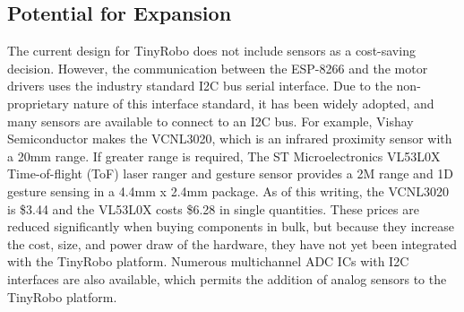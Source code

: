 \documentclass[]{article}
\begin{document}
\subsection{Potential for Expansion}

The current design for TinyRobo does not include sensors as a cost-saving decision. 
However, the communication between the ESP-8266 and the motor drivers uses the industry standard I2C bus serial interface. 
Due to the non-proprietary nature of this interface standard, it has been widely adopted, and many sensors are available to connect to an I2C bus. 
For example, Vishay Semiconductor makes the VCNL3020, which is an infrared proximity sensor with a 20mm range. 
If greater range is required, The ST Microelectronics VL53L0X Time-of-flight (ToF) laser ranger and gesture sensor provides a 2M range and 1D gesture sensing in a 4.4mm x 2.4mm package. 
As of this writing, the VCNL3020 is \$3.44 and the VL53L0X costs \$6.28 in single quantities.
These prices are reduced significantly when buying components in bulk, but because they increase the cost, size, and power draw of the hardware, they have not yet been integrated with the TinyRobo platform. 
Numerous multichannel ADC ICs with I2C interfaces are also available, which permits the addition of analog sensors to the TinyRobo platform. 




\end{document}
